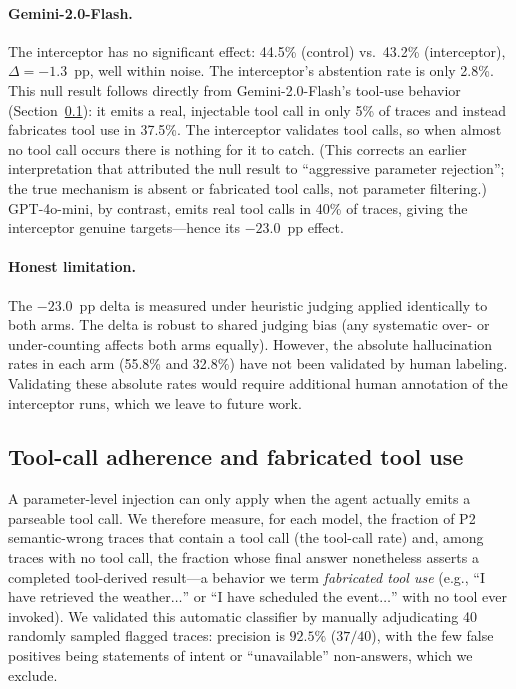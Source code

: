 \documentclass{article}
\begin{document}
\paragraph{Gemini-2.0-Flash.}
The interceptor has no significant effect: 44.5\% (control) vs.\
43.2\% (interceptor), $\Delta{=}{-}1.3$~pp, well within noise.
The interceptor's abstention rate is only 2.8\%.
This null result follows directly from Gemini-2.0-Flash's tool-use behavior
(Section~\ref{sec:toolcall}): it emits a real, injectable tool call in only
5\% of traces and instead fabricates tool use in 37.5\%. The interceptor
validates tool calls, so when almost no tool call occurs there is nothing for
it to catch. (This corrects an earlier interpretation that attributed the null
result to ``aggressive parameter rejection''; the true mechanism is absent or
fabricated tool calls, not parameter filtering.) GPT-4o-mini, by contrast,
emits real tool calls in 40\% of traces, giving the interceptor genuine
targets---hence its $-23.0$~pp effect.

\paragraph{Honest limitation.}
The $-23.0$~pp delta is measured under heuristic judging applied
identically to both arms.
The delta is robust to shared judging bias (any systematic over- or
under-counting affects both arms equally).
However, the absolute hallucination rates in each arm (55.8\% and
32.8\%) have not been validated by human labeling.
Validating these absolute rates would require additional human
annotation of the interceptor runs, which we leave to future work.


\subsection{Tool-call adherence and fabricated tool use}
\label{sec:toolcall}

A parameter-level injection can only apply when the agent actually emits a
parseable tool call. We therefore measure, for each model, the fraction of P2
semantic-wrong traces that contain a tool call (the tool-call rate) and, among
traces with no tool call, the fraction whose final answer nonetheless asserts a
completed tool-derived result---a behavior we term \emph{fabricated tool use}
(e.g., ``I have retrieved the weather$\ldots$'' or ``I have scheduled the
event$\ldots$'' with no tool ever invoked). We validated this automatic
classifier by manually adjudicating 40 randomly sampled flagged traces:
precision is $92.5\%$ ($37/40$), with the few false positives being statements
of intent or ``unavailable'' non-answers, which we exclude.
\end{document}
